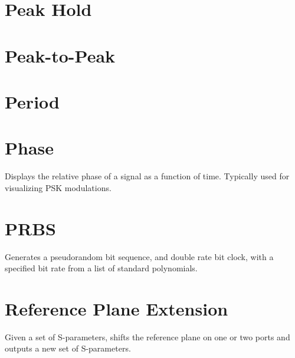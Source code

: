 \section{Peak Hold}

\pagebreak
\section{Peak-to-Peak}

\pagebreak
\section{Period}

\pagebreak
\section{Phase}

Displays the relative phase of a signal as a function of time. Typically used for visualizing PSK modulations.

\pagebreak
\section{PRBS}

Generates a pseudorandom bit sequence, and double rate bit clock, with a specified bit rate from a list of standard
polynomials.

\pagebreak
\section{Reference Plane Extension}

Given a set of S-parameters, shifts the reference plane on one or two ports and outputs a new set of S-parameters.

\pagebreak

